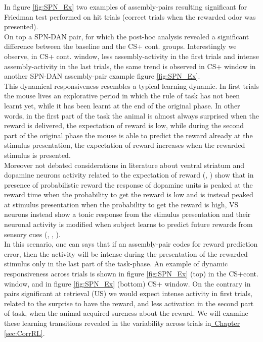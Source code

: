 In figure \ref{fig:SPN_Ex} two examples of assembly-pairs resulting significant for Friedman test performed on hit trials (correct trials when the rewarded odor was presented).\\On top a SPN-DAN pair, for which the post-hoc analysis revealed a significant difference between the baseline and the CS+ cont. groups. Interestingly we observe, in CS+ cont. window, less assembly-activity in the first trials and intense assembly-activity in the last trials, the same trend is observed in CS+ window in another SPN-DAN assembly-pair example figure \ref{fig:SPN_Ex}.\\This dynamical responsiveness resembles a typical learning dynamic. In first trials the mouse lives an explorative period in which the rule of task has not been learnt yet, while it has been learnt at the end of the original phase. In other words, in the first part of the task the animal is almost always surprised when the reward is delivered, the expectation of reward is low, while during the second part of the original phase the mouse is able to predict the reward already at the stimulus presentation, the expectation of reward increases when the rewarded stimulus is presented.\\Moreover not debated considerations in literature about ventral striatum and dopamine neurons activity related to the expectation of reward (\cite{Schultz1992}, \cite{Schultz} \cite{Fiorillo}) show that in presence of probabilistic reward the response of dopamine units is peaked at the reward time when the probability to get the reward is low and is instead peaked at stimulus presentation when the probability to get the reward is high, VS neurons instead show a tonic response from the stimulus presentation and their neuronal activity is modified when subject learns to predict future rewards from sensory cues (\cite{Pagnoni}, \cite{Schultz2000}, \cite{Radua}).\\In this scenario, one can says that if an assembly-pair codes for reward prediction error, then the activity will be intense during the presentation of the rewarded stimulus only in the last part of the task-phase. An example of dynamic responsiveness across trials is shown in figure \ref{fig:SPN_Ex} (top) in the CS+cont. window, and in figure \ref{fig:SPN_Ex} (bottom) CS+ window. On the contrary in pairs significant at retrieval (US) we would expect intense activity in first trials, related to the surprise to have the reward, and less activation in the second part of task, when the animal acquired sureness about the reward. We will examine these learning transitions revealed in the variability across trials in\hyperref[sec:CorrRL]{~Chapter \ref*{sec:CorrRL}}.\\
